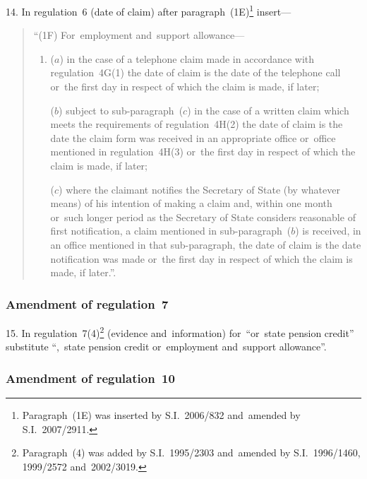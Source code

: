 \documentclass[12pt,a4paper]{article}
\begin{document}
14.  In regulation~6 (date of claim) after paragraph~(1E)\footnote{Paragraph~(1E) was inserted by S.I.~2006/832 and~amended by S.I.~2007/2911.} insert—
\begin{quotation}
“(1F) For~employment and~support allowance—
\begin{enumerate}\item[]
($a$) in the case of a telephone claim made in accordance with regulation~4G(1) the date of claim is the date of the telephone call or~the first day in respect of which the claim is made, if later;

($b$) subject to sub-paragraph~($c$)  in the case of a written claim which meets the requirements of regulation~4H(2) the date of claim is the date the claim form was received in an appropriate office or~office mentioned in regulation~4H(3) or~the first day in respect of which the claim is made, if later;

($c$) where the claimant notifies the Secretary of State (by whatever means) of his intention of making a claim and, within one month or~such longer period as the Secretary of State considers reasonable of first notification, a claim mentioned in sub-paragraph~($b$)  is received, in an office mentioned in that sub-paragraph, the date of claim is the date notification was made or~the first day in respect of which the claim is made, if later.”.
\end{enumerate}
\end{quotation}

\subsubsection[15. Amendment of regulation~7]{Amendment of regulation~7}

15.  In regulation~7(4)\footnote{Paragraph~(4) was added by S.I.~1995/2303 and~amended by S.I.~1996/1460, 1999/2572 and~2002/3019.} (evidence and~information) for~“or~state pension credit” substitute “,~state pension credit or~employment and~support allowance”.

\subsubsection[16. Amendment of regulation~10]{Amendment of regulation~10}
\end{document}
